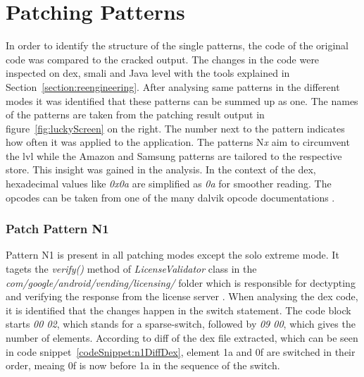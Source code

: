 \section{Patching Patterns} \label{section:luckypatcher-patterns}
In order to identify the structure of the single patterns, the code of the original code was compared to the cracked output.
The changes in the code were inspected on dex, smali and Java level with the tools explained in Section~\ref{section:reengineering}.
After analysing same patterns in the different modes it was identified that these patterns can be summed up as one.
\newline
The names of the patterns are taken from the patching result output in figure~\ref{fig:luckyScreen} on the right.
The number next to the pattern indicates how often it was applied to the application.
The patterns N\textit{x} aim to circumvent the \gls{lvl} while the Amazon and Samsung patterns are tailored to the respective store.
This insight was gained in the analysis.
In the context of the \gls{dex}, hexadecimal values like \textit{0x0a} are simplified as \textit{0a} for smoother reading.
The opcodes can be taken from one of the many dalvik opcode documentations \cite{opcodes}.


\subsubsection{Patch Pattern N1}
Pattern N1 is present in all patching modes except the solo extreme mode.
It tagets the \textit{verify()} method of \textit{LicenseValidator} class in the \textit{com/google/android/vending/licensing/} folder which is responsible for dectypting and verifying the response from the license server \cite{developersLicensingReference}.
\newline
When analysing the dex code, it is identified that the changes happen in the switch statement.
The code block starts \textit{00 02}, which stands for a sparse-switch, followed by \textit{09 00}, which gives the number of elements.
According to diff of the \gls{dex} file extracted, which can be seen in code snippet~\ref{codeSnippet:n1DiffDex}, element 1a and 0f are switched in their order, meaing 0f is now before 1a in the sequence of the switch.
\newline


